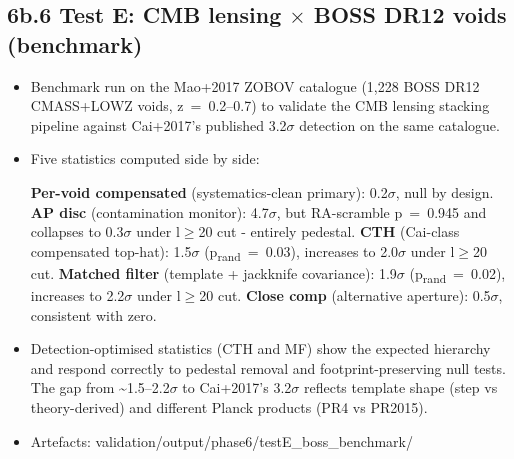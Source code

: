 \documentclass[11pt,a4paper]{article}
\begin{document}
\subsection{6b.6 Test E: CMB lensing $\times$ BOSS DR12 voids (benchmark)}
\begin{itemize}
  \item Benchmark run on the Mao+2017 ZOBOV catalogue (1,228 BOSS DR12 CMASS+LOWZ voids, z~=~0.2--0.7) to validate the CMB lensing stacking pipeline against Cai+2017's published 3.2$\sigma$ detection on the same catalogue.
  \item Five statistics computed side by side:
    
\textbf{Per-void compensated} (systematics-clean primary): 0.2$\sigma$, null by design.
\textbf{AP disc} (contamination monitor): 4.7$\sigma$, but RA-scramble p~=~0.945 and collapses to 0.3$\sigma$ under l$\ge$20 cut  -  entirely pedestal.
\textbf{CTH} (Cai-class compensated top-hat): 1.5$\sigma$ (p\textsubscript{rand}~=~0.03), increases to 2.0$\sigma$ under l$\ge$20 cut.
\textbf{Matched filter} (template + jackknife covariance): 1.9$\sigma$ (p\textsubscript{rand}~=~0.02), increases to 2.2$\sigma$ under l$\ge$20 cut.
\textbf{Close comp} (alternative aperture): 0.5$\sigma$, consistent with zero.
  \item Detection-optimised statistics (CTH and MF) show the expected hierarchy and respond correctly to pedestal removal and footprint-preserving null tests. The gap from \~{}1.5--2.2$\sigma$ to Cai+2017's 3.2$\sigma$ reflects template shape (step vs theory-derived) and different Planck products (PR4 vs PR2015).
  \item Artefacts: validation/\allowbreak{}output/\allowbreak{}phase6/\allowbreak{}testE\_\allowbreak{}boss\_\allowbreak{}benchmark/\allowbreak{}
\end{itemize}
\end{document}
